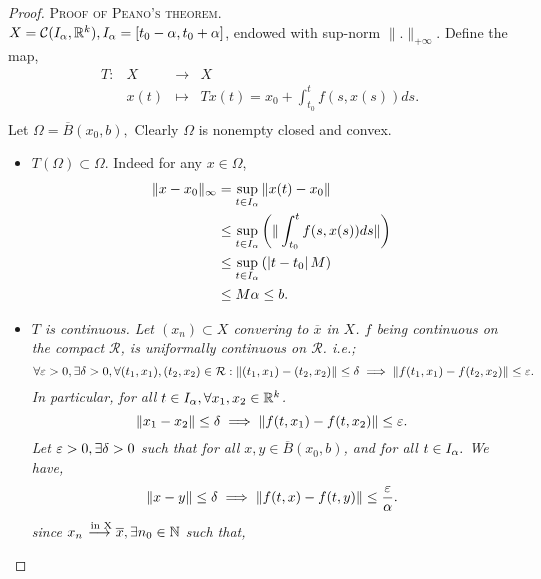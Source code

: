 \begin{proof}
\textsc{Proof of Peano's theorem.} \\ $X = \mathcal{C} (I_{\alpha}, \mathbb{R} ^k ),I_{\alpha} = \left[ t_0 -\alpha, t_0 + \alpha\right]$, 
endowed with sup-norm $\| . \| _{+\infty }. $ Define the map,
\[
\begin{array}{cccc}
      T : &  X  & \longrightarrow & X \\

           &  x(t)   & \longmapsto     & Tx(t) = x_0 + \int_{t_0}^{t} f(s, x(s) ) ds. \\ 
\end{array}
\]
Let $\Omega  = \overline{B}(x_0, b),$ Clearly $\Omega  $ is nonempty closed and convex. 
\begin{itemize}
  \item[\ding{50}] $T(\Omega ) \subset \Omega  $. Indeed for any $x \in \Omega $, 
    \begin{align*}
      \| x-x_0 \| _{\infty } &=
      \sup_{t \in   I_{\alpha}} 
      \| x(t) - x_0 \| \\
                              & \leq 
                              \sup_{t \in  I_{\alpha}} 
                              \left( \| \int_{t_0}^{t} f(s, x(s) ) ds \|  \right)  \\
                              & \leq 
                              \sup_{t \in   I_{\alpha}} 
                              \left( \left| t-t_0 \right|  M \right) \\
                              & \leq  M \alpha \leq b.
    \end{align*}
 \item[\ding{50}] \it $T $ is continuous. \normalfont Let $(x_n ) \subset X $ convering to $\overline{x}$ in $X $. 
   $f $ being continuous on the compact $\mathcal{R}  $, is uniformally continuous on $\mathcal{R}$. i.e.;
   \[
   \forall \varepsilon > 0,  \exists \delta > 0,  \forall (t_1, x_1) , (t_2, x_2) \in  
   \mathcal{R}: 
   \| (t_1, x_1) - (t_2, x_2)  \| \leq \delta  \implies 
   \| f(t_1, x_1) - f(t_2, x_2)  \| \leq  \varepsilon.
   \]
   In particular, for all $t \in   I_{\alpha}, \forall  x_1, x_2 \in   \mathbb{R} ^k  $. 
   \[
   \| x_1 - x_2 \| \leq  \delta  \implies 
   \| f(t, x_1) - f(t, x_2)  \| \leq  \varepsilon .
   \]
   Let $\varepsilon  > 0, \exists  \delta  > 0 $ such that for all $x, y \in  \overline{B}(x_0, b)$, and for all
   $t \in   I_{\alpha}. $ We have,
   \[
   \| x-y \| \leq  \delta  \implies 
   \| f(t,x) - f(t, y)  \| \leq  \frac{\varepsilon }{\alpha}.
   \]
 since $x_n  \overset{\text{ in X}  }{ \longrightarrow }\overline{x}, \exists n_0 \in   \mathbb{N}$ such that,

\end{itemize}
\end{proof}
